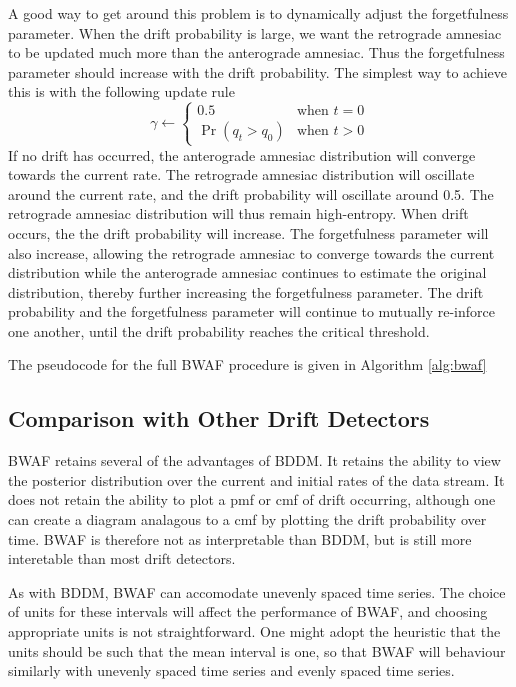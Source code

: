 A good way to get around this problem is to dynamically adjust the forgetfulness parameter. When the drift probability is large, we want the retrograde amnesiac to be updated much more than the anterograde amnesiac. Thus the forgetfulness parameter should increase with the drift probability. The simplest way to achieve this is with the following update rule
\begin{equation}
    \gamma \gets \begin{cases}
        0.5 & \text{when }t=0 \\
        \Pr(q_t > q_0) & \text{when }t>0
    \end{cases}
\end{equation}
If no drift has occurred, the anterograde amnesiac distribution will converge towards the current rate. The retrograde amnesiac distribution will oscillate around the current rate, and the drift probability will oscillate around 0.5. The retrograde amnesiac distribution will thus remain high-entropy. When drift occurs, the the drift probability will increase. The forgetfulness parameter will also increase, allowing the retrograde amnesiac to converge towards the current distribution while the anterograde amnesiac continues to estimate the original distribution, thereby further increasing the forgetfulness parameter. The drift probability and the forgetfulness parameter will continue to mutually re-inforce one another, until the drift probability reaches the critical threshold. 

The pseudocode for the full BWAF procedure is given in Algorithm \ref{alg:bwaf}

\subsection{Comparison with Other Drift Detectors}

BWAF retains several of the advantages of BDDM. It retains the ability to view the posterior distribution over the current and initial rates of the data stream. It does not retain the ability to plot a pmf or cmf of drift occurring, although one can create a diagram analagous to a cmf by plotting the drift probability over time. BWAF is therefore not as interpretable than BDDM, but is still more interetable than most drift detectors. 

As with BDDM, BWAF can accomodate unevenly spaced time series. The choice of units for these intervals will affect the performance of BWAF, and choosing appropriate units is not straightforward. One might adopt the heuristic that the units should be such that the mean interval is one, so that BWAF will behaviour similarly with unevenly spaced time series and evenly spaced time series. 

